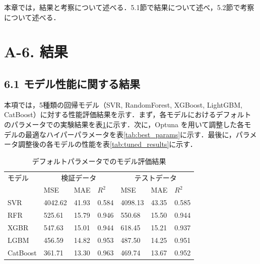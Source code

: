 本章では，結果と考察について述べる．5.1節で結果について述べ，5.2節で考察について述べる．

\section*{A-6. 結果}

\subsection*{6.1 モデル性能に関する結果}
本項では，5種類の回帰モデル（SVR, RandomForest, XGBoost, LightGBM, CatBoost）に対する性能評価結果を示す．まず，各モデルにおけるデフォルトのパラメータでの実験結果を表\ref{tab:default_results}に示す．次に，Optuna を用いて調整した各モデルの最適なハイパーパラメータを表\ref{tab:best_params}に示す．最後に，パラメータ調整後の各モデルの性能を表\ref{tab:tuned_results}に示す．
\begin{table}[htbp]
    \centering
    \caption{デフォルトパラメータでのモデル評価結果}
    \label{tab:default_results}
    \begin{tabular}{l|p{0.8cm}p{0.8cm}p{0.8cm}|p{0.8cm}p{0.8cm}p{0.8cm}}
        \hline\hline\hline
        モデル & \multicolumn{3}{c|}{検証データ} & \multicolumn{3}{c}{テストデータ} \\
               & MSE & MAE & $R^2$ & MSE & MAE & $R^2$ \\
        \hline
        SVR       & 4042.62 & 41.93 & 0.584 & 4098.13 & 43.35 & 0.585 \\
        RFR       & 525.61  & 15.79 & 0.946 & 550.68  & 15.50 & 0.944 \\
        XGBR      & 547.63  & 15.01 & 0.944 & 618.45  & 15.21 & 0.937 \\
        LGBM      & 456.59  & 14.82 & 0.953 & 487.50  & 14.25 & 0.951 \\
        CatBoost  & 361.71  & 13.30 & 0.963 & 469.74  & 13.67 & 0.952 \\
        \hline\hline\hline
    \end{tabular}
\end{table}

